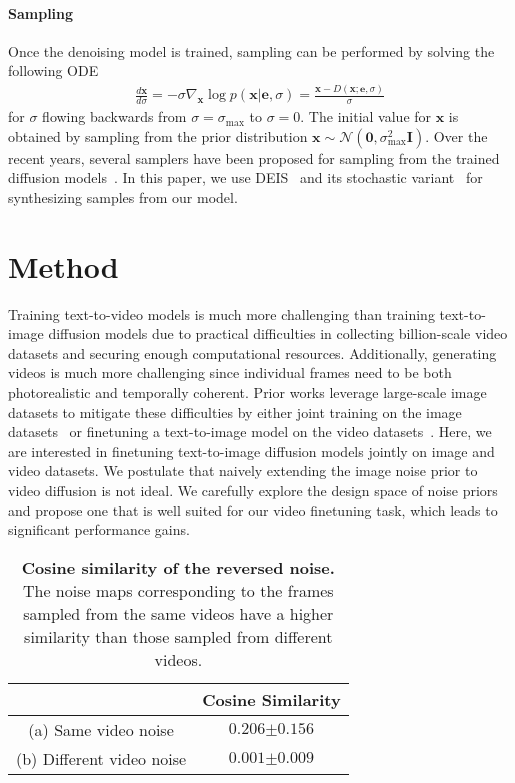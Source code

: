 \documentclass[10pt,twocolumn,letterpaper]{article}
\newcommand{\xx}{\mathbf{x}}
\newcommand{\ee}{\mathbf{e}}
\newcommand{\bzero}{\mathbf{0}}
\newcommand{\bI}{\mathbf{I}}
\newcommand{\cN}{\mathcal{N}}
\newcommand{\new}[1]{#1}
\newcommand{\tabcspace}{\vspace{-2mm}}
\begin{document}
\paragraph{Sampling} 
Once the denoising model is trained, sampling can be performed by solving the following ODE~\cite{karras2022elucidating}
\begin{align}\label{eq:ode}
    \frac{d\xx}{d\sigma} = -\sigma \nabla_{\xx} \log p(\xx | \ee, \sigma) = \frac{\xx - D(\xx; \ee, \sigma)}{\sigma}
\end{align}
for $\sigma$ flowing backwards from $\sigma = \sigma_{\text{max}}$ to $\sigma=0$. The initial value for $\xx$ is obtained by sampling from the prior distribution $\xx \sim \cN(\bzero, \sigma_{\max}^2 \bI)$. Over the recent years, several samplers have been proposed for sampling from the trained diffusion models~\cite{zhang2023fast, song2021denoising, liu2022pseudo, lu2022dpm, ho2020denoising}. In this paper, we use DEIS~\cite{zhang2023fast} and its stochastic variant~\cite{karras2022elucidating} for synthesizing samples from our model.


\section{Method}\label{sec:method}

Training text-to-video models is much more challenging than training text-to-image diffusion models due to practical difficulties in collecting billion-scale video datasets and securing enough computational resources. Additionally, generating videos is much more challenging since individual frames need to be both photorealistic and temporally coherent. Prior works leverage large-scale image datasets to mitigate these difficulties by either joint training on the image datasets~\cite{wu2022nuwa,ho2022video,ho2022imagen} or finetuning a text-to-image model on the video datasets~\cite{hong2022cogvideo,singer2022make}. Here, we are interested in finetuning text-to-image diffusion models jointly on image and video datasets. We postulate that naively extending the image noise prior to video diffusion is not ideal. We carefully explore the design space of noise priors and propose one that is well suited for our video finetuning task, which leads to significant performance gains. 


\setlength{\tabcolsep}{8pt}
\renewcommand{\arraystretch}{1}
\begin{table}[t]
    \centering
    \caption{\new{\textbf{Cosine similarity of the reversed noise.} The noise maps corresponding to the frames sampled from the same videos have a higher similarity than those sampled from different videos.}}
    \label{tab:cosine_sim}
    \tabcspace
    \begin{tabular}{c|c}
    \toprule
     & Cosine Similarity                          \\
    \midrule
    (a) Same video noise      & $0.206$\small{$\pm 0.156$} \\
    (b) Different video noise & $0.001$\small{$\pm 0.009$} \\
    \bottomrule
    \end{tabular}
\end{table}
\end{document}
